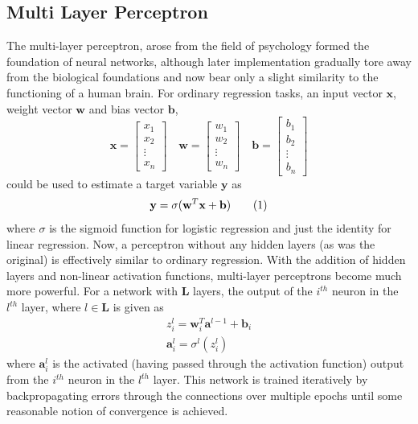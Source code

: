 \documentclass[%
 twocolumn,
 reprint,
 amsmath,amssymb,
 aps,nofootinbib
]{revtex4-2}
\newcommand\numberthis{\addtocounter{equation}{1}\tag{\theequation}} %
\begin{document}
\subsection{\label{app:mlp}Multi Layer Perceptron}
The multi-layer perceptron, arose from the field of psychology \cite{mlp} formed the foundation of neural networks, although later implementation gradually tore away from the biological foundations and now bear only a slight similarity to the functioning of a human brain. For ordinary regression tasks, an input vector $\mathbf{x}$, weight vector $\mathbf{w}$ and bias vector $\mathbf{b}$,
\[
\mathbf{x} = \begin{bmatrix}
x_1 \\
x_2 \\
\vdots \\
x_n
\end{bmatrix}
\quad
\mathbf{w} = \begin{bmatrix}
w_1 \\
w_2 \\
\vdots \\
w_n
\end{bmatrix}
\quad
\mathbf{b} = \begin{bmatrix}
b_1 \\
b_2 \\
\vdots \\
b_n
\end{bmatrix}
\]
could be used to estimate a target variable $\mathbf{y}$ as 
\[
\mathbf{y} = \sigma(\mathbf{w}^T\mathbf{x}+\mathbf{b}) \numberthis  \label{eq:mlp}
\]
where $\sigma$ is the sigmoid function for logistic regression and just the identity for linear regression. Now, a perceptron without any hidden layers (as was the original) is effectively similar to ordinary regression. With the addition of hidden layers and non-linear activation functions, multi-layer perceptrons become much more powerful. For a network with $\mathbf{L}$ layers, the output of the $i^{th}$ neuron in the $l^{th}$ layer, where $l \in \mathbf{L}$ is given as
\begin{gather}
z^{l}_{i} = \mathbf{w}^{T}_{i}\mathbf{a}^{l-1} + \mathbf{b}_i \label{eq:mlp_inactivate} \\
\mathbf{a}^{l}_i = \sigma^{l}(z^{l}_{i}) \label{eq:mlp_activated}
\end{gather}
where $\mathbf{a}^{l}_{i}$ is the activated (having passed through the activation function) output from the $i^{th}$ neuron in the $l^{th}$ layer. This network is trained iteratively by backpropagating \cite{backprop} errors through the connections over multiple epochs until some reasonable notion of convergence is achieved.
\end{document}
